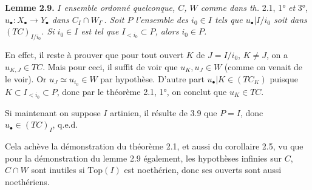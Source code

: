 \documentclass[11pt]{article}
\newcommand{\msp}[1]{\ifstrequal{#1}{page 1}{}{\marginpar{\footnotesize [#1]}}}
\begin{document}
\msp{37}

\noindent\textbf{Lemme 2.9.} \textit{$I$ ensemble ordonné quelconque, $C$, $W$ comme dans th.} 2.1, 1° \textit{et} 3°, \textit{$u_\bullet : X_\bullet \longrightarrow Y_\bullet$ dans $C_I \cap W_{I^\circ}$. Soit $P$ l'ensemble des $i_0 \in I$ tels que $u_\bullet|I/i_0$ soit dans $(TC)_{I/i_0}$. Si $i_0 \in I$ est tel que $I_{<i_0} \subset P$, alors $i_0 \in P$.}

En effet, il reste à prouver que pour tout ouvert $K$ de $J = I/i_0$, $K \neq J$, on a $u_{K,J} \in TC$. Mais pour ceci, il suffit de voir que $u_K, u_J \in W$ (comme on venait de le voir). Or $u_J \simeq u_{i_0} \in W$ par hypothèse. D'autre part $u_\bullet|K \in (TC_K)$ puisque $K \subset I_{<i_0} \subset P$, donc par le théorème 2.1, 1°, on conclut que $u_K \in TC$.

Si maintenant on suppose $I$ artinien, il résulte de 3.9 que $P = I$, donc $u_\bullet \in (TC)_I$, q.e.d. %

Cela achève la démonstration du théorème 2.1, et aussi du corollaire 2.5, vu que pour la démonstration du lemme 2.9 également, les hypothèses infinies sur $C$, $C \cap W$ sont inutiles si $\mathrm{Top}(I)$ est noethérien, donc ses ouverts sont aussi noethériens.
\end{document}
